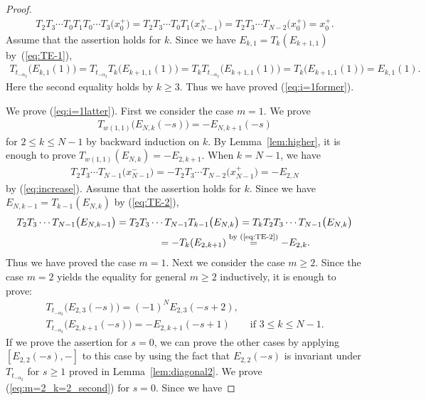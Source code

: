 \documentclass[pdftex]{sigma}
\theoremstyle{definition}
\numberwithin{equation}{section}
\begin{document}
\begin{proof}
\begin{gather*}
T_2 T_3 \cdots T_0 T_1 T_0 \cdots T_3\big(x_0^+\big) = T_2 T_3 \cdots T_0 T_1 \big(x_{N-1}^+\big) = T_2 T_3 \cdots T_{N-2} \big(x_0^+\big) = x_0^+.
\end{gather*}
Assume that the assertion holds for $k$. Since we have $E_{k,1} = T_k(E_{k+1,1})$ by~(\ref{eq:TE-1}),
\begin{gather*}
T_{t_{-\alpha_2}}\big(E_{k,1}(1)\big) = T_{t_{-\alpha_2}} T_{k}\big(E_{k+1,1}(1)\big) = T_{k} T_{t_{-\alpha_2}}\big(E_{k+1,1}(1)\big) = T_k \big(E_{k+1,1}(1)\big) = E_{k,1}(1).
\end{gather*}
Here the second equality holds by $k \geq 3$. Thus we have proved (\ref{eq:i=1former}).

We prove (\ref{eq:i=1latter}). First we consider the case $m=1$. We prove
\begin{gather*}
T_{w(1,1)} \big(E_{N,k}(-s)\big)=-E_{N,k+1}(-s)
\end{gather*}
for $2 \leq k \leq N-1$ by backward induction on $k$. By Lemma~\ref{lem:higher}, it is enough to prove $T_{w(1,1)}(E_{N,k})=-E_{2,k+1}$. When $k=N-1$, we have
\begin{gather*}
T_2 T_3 \cdots T_{N-1}\big(x_{N-1}^-\big) = -T_2 T_3 \cdots T_{N-2}\big(x_{N-1}^+\big) = -E_{2,N}
\end{gather*}
by (\ref{eq:increase}). Assume that the assertion holds for $k$. Since we have $E_{N,k-1}=T_{k-1}(E_{N,k})$ by (\ref{eq:TE-2}),
\begin{gather*}
T_2 T_3 \cdots T_{N-1}\big(E_{N,k-1}\big) = T_2 T_3 \cdots T_{N-1} T_{k-1}\big(E_{N,k}\big) = T_k T_2 T_3 \cdots T_{N-1} \big(E_{N,k}\big)\\
\hphantom{T_2 T_3 \cdots T_{N-1}\big(E_{N,k-1}\big)}{} = -T_k(E_{2,k+1}) \overset{\text{by (\ref{eq:TE-2})}}{=} -E_{2,k}.
\end{gather*}
Thus we have proved the case $m=1$. Next we consider the case $m \geq 2$. Since the case $m=2$ yields the equality for general $m \geq 2$ inductively, it is enough to prove:
\begin{gather}
T_{t_{-\alpha_2}}\big(E_{2,3}(-s)\big) = (-1)^N E_{2,3}(-s+2), \label{eq:m=2_k=2_second}\\
T_{t_{-\alpha_2}}\big(E_{2,k+1}(-s)\big) = -E_{2,k+1}(-s+1) \qquad \text{if $3 \leq k \leq N-1$}. \label{eq:m=2_k+1_second}
\end{gather}
If we prove the assertion for $s=0$, we can prove the other cases by applying $[E_{2,2}(-s),-]$ to this case by using the fact that $E_{2,2}(-s)$ is invariant under $T_{t_{-\alpha_2}}$ for $s \geq 1$ proved in Lemma~\ref{lem:diagonal2}. We prove (\ref{eq:m=2_k=2_second}) for $s=0$. Since we have

\end{proof}
\end{document}
